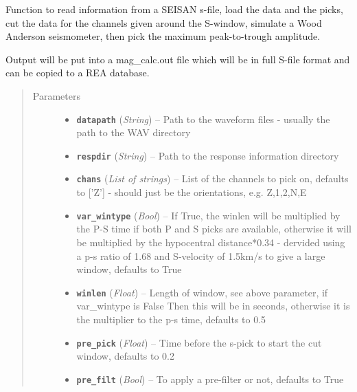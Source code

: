 \documentclass[a4paper,10pt,english]{sphinxmanual}
\begin{document}
\begin{fulllineitems}
\label{submodules/utils.mag_calc:mag_calc.Amp_pick_sfile}
Function to read information from a SEISAN s-file, load the data and the
picks, cut the data for the channels given around the S-window, simulate
a Wood Anderson seismometer, then pick the maximum peak-to-trough
amplitude.

Output will be put into a mag\_calc.out file which will be in full S-file
format and can be copied to a REA database.
\begin{quote}\begin{description}
\item[{Parameters}] \leavevmode\begin{itemize}
\item {} 
\textbf{\texttt{datapath}} (\emph{String}) -- Path to the waveform files - usually the path to the WAV directory

\item {} 
\textbf{\texttt{respdir}} (\emph{String}) -- Path to the response information directory

\item {} 
\textbf{\texttt{chans}} (\emph{List of strings}) -- List of the channels to pick on, defaults to {[}'Z'{]} - should
just be the orientations, e.g. Z,1,2,N,E

\item {} 
\textbf{\texttt{var\_wintype}} (\emph{Bool}) -- If True, the winlen will be
multiplied by the P-S time if both P and S picks are
available, otherwise it will be multiplied by the hypocentral
distance*0.34 - dervided using a p-s ratio of 1.68 and
S-velocity of 1.5km/s to give a large window, defaults to True

\item {} 
\textbf{\texttt{winlen}} (\emph{Float}) -- Length of window, see above parameter, if var\_wintype is False
Then this will be in seconds, otherwise it is the multiplier
to the p-s time, defaults to 0.5

\item {} 
\textbf{\texttt{pre\_pick}} (\emph{Float}) -- Time before the s-pick to start the cut window, defaults
to 0.2

\item {} 
\textbf{\texttt{pre\_filt}} (\emph{Bool}) -- To apply a pre-filter or not, defaults to True


\end{itemize}
\end{description}
\end{quote}
\end{fulllineitems}
\end{document}
